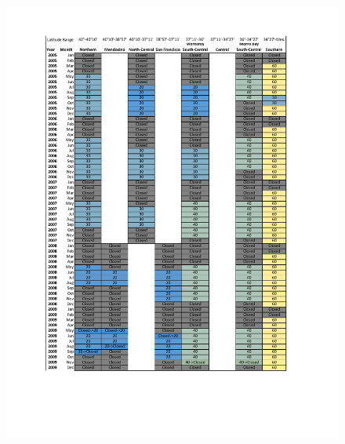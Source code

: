 \documentclass[12pt,]{article}
\begin{document}
\begin{figure}
\centering
\includegraphics{Figures/Rec_regs2.pdf}
\caption{\label{fig:Rec_regs2}}
\end{figure}

\FloatBarrier
\end{document}
